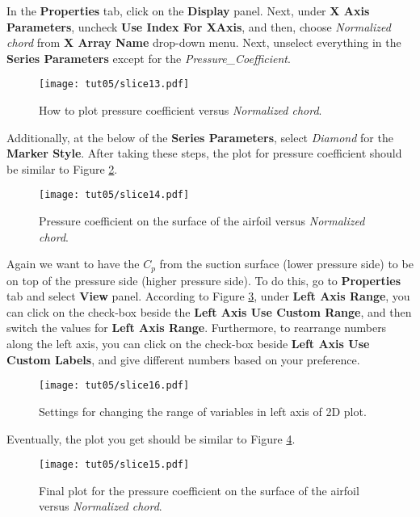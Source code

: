 In the \textbf{Properties} tab, click on the \textbf{Display} panel. Next, under \textbf{X Axis Parameters}, uncheck \textbf{Use Index For XAxis}, and then, choose \textit{Normalized chord} from \textbf{X Array Name} drop-down menu. Next, unselect everything in the \textbf{Series Parameters} except for the \textit{Pressure\_Coefficient}. 
\begin{figure}[htbp]
    \centering
    \texttt{[image: tut05/slice13.pdf]}
    \caption{How to plot pressure coefficient versus \textit{Normalized chord}.}
    \label{fig5:slice13}
\end{figure}
Additionally, at the below of the \textbf{Series Parameters}, select \textit{Diamond} for the \textbf{Marker Style}. After taking these steps, the plot for pressure coefficient should be similar to Figure \ref{fig5:slice14}.
\begin{figure}[htbp]
    \centering
    \texttt{[image: tut05/slice14.pdf]}
    \caption{Pressure coefficient on the surface of the airfoil versus \textit{Normalized chord}.}
    \label{fig5:slice14}
\end{figure}
Again we want to have the $C_p$ from the suction surface (lower pressure side) to be on top of the pressure side (higher pressure side). To do this, go to \textbf{Properties} tab and select \textbf{View} panel. According to Figure \ref{fig5:slice16}, under \textbf{Left Axis Range}, you can click on the check-box beside the \textbf{Left Axis Use Custom Range}, and then switch the values for \textbf{Left Axis Range}. Furthermore, to rearrange numbers along the left axis, you can click on the check-box beside \textbf{Left Axis Use Custom Labels}, and give different numbers based on your preference.
\begin{figure}[htbp]
    \centering
    \texttt{[image: tut05/slice16.pdf]}
    \caption{Settings for changing the range of variables in left axis of 2D plot.}
    \label{fig5:slice16}
\end{figure}
Eventually, the plot you get should be similar to Figure \ref{fig5:slice15}.
\begin{figure}[htbp]
    \centering
    \texttt{[image: tut05/slice15.pdf]}
    \caption{Final plot for the pressure coefficient on the surface of the airfoil versus \textit{Normalized chord}.}
    \label{fig5:slice15}
\end{figure}
